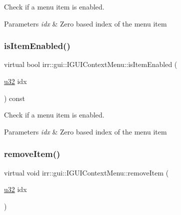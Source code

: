 Check if a menu item is enabled. 


\begin{DoxyParams}{Parameters}
{\em idx} & Zero based index of the menu item \\
\hline
\end{DoxyParams}
\mbox{\label{classirr_1_1gui_1_1IGUIContextMenu_a0064345c63e1f8e124e64ca96eb486e2}} 
\subsubsection{\texorpdfstring{is\+Item\+Enabled()}{isItemEnabled()}\hspace{0.1cm}{\footnotesize\ttfamily [2/2]}}
{\footnotesize\ttfamily virtual bool irr\+::gui\+::\+I\+G\+U\+I\+Context\+Menu\+::is\+Item\+Enabled (\begin{DoxyParamCaption}\item[{\hyperlink{namespaceirr_a0416a53257075833e7002efd0a18e804}{u32}}]{idx }\end{DoxyParamCaption}) const\hspace{0.3cm}{\ttfamily [pure virtual]}}



Check if a menu item is enabled. 


\begin{DoxyParams}{Parameters}
{\em idx} & Zero based index of the menu item \\
\hline
\end{DoxyParams}
\mbox{\label{classirr_1_1gui_1_1IGUIContextMenu_af8cc0fc0f430044a318d4597f8535e9b}} 
\subsubsection{\texorpdfstring{remove\+Item()}{removeItem()}\hspace{0.1cm}{\footnotesize\ttfamily [1/2]}}
{\footnotesize\ttfamily virtual void irr\+::gui\+::\+I\+G\+U\+I\+Context\+Menu\+::remove\+Item (\begin{DoxyParamCaption}\item[{\hyperlink{namespaceirr_a0416a53257075833e7002efd0a18e804}{u32}}]{idx }\end{DoxyParamCaption})\hspace{0.3cm}{\ttfamily [pure virtual]}}




